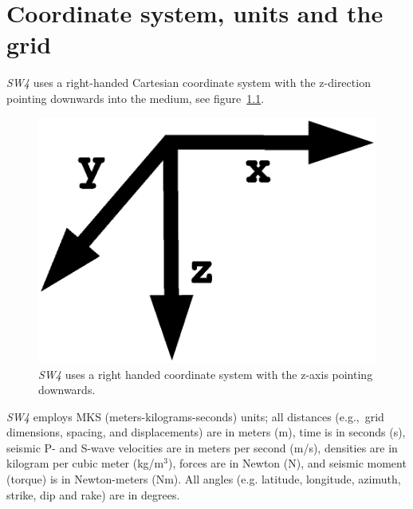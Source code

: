 \documentclass[11pt]{report}
\begin{document}
\chapter{Coordinate system, units and the grid}
%
\emph{SW4} uses a right-handed Cartesian coordinate system with the z-direction pointing
downwards into the medium, see figure~\ref{fig:coordsys}. 
\begin{figure}[th]
\begin{centering}
 \includegraphics[height=0.2\linewidth]{rightHandedCoord.ps}
  \caption{\emph{SW4} uses a right handed coordinate system with the z-axis pointing
  downwards.}
  \label{fig:coordsys}
\end{centering}
\end{figure}
\emph{SW4} employs MKS (meters-kilograms-seconds) units; all distances (e.g.,~grid dimensions,
spacing, and displacements) are in meters (m), time is in seconds (s), seismic P- and S-wave
velocities are in meters per second (m/s), densities are in kilogram per cubic meter (kg/m$^3$),
forces are in Newton (N), and seismic moment (torque) is in Newton-meters (Nm). All angles
(e.g. latitude, longitude, azimuth, strike, dip and rake) are in degrees. 
\end{document}
